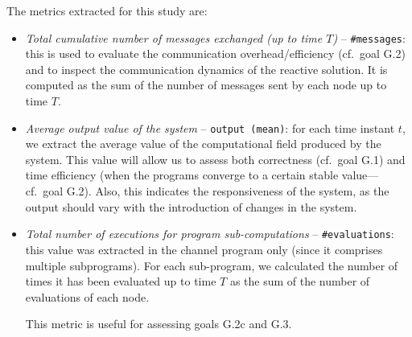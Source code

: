The metrics extracted for this study are:
\begin{itemize}
  \item \emph{Total cumulative number of messages exchanged (up to time $T$)}  -- \texttt{\#messages}: 
 this is used to evaluate the communication overhead/efficiency (cf.\ goal G.2)
 and to inspect the communication dynamics of the reactive solution.
  It is computed as the sum of the number of messages sent by each node up to time $T$.
    
  \item \emph{Average output value of the system} -- \texttt{output (mean)}: for each time instant $t$, we extract the average value of the computational field produced by the system.
  This value will allow us to assess both correctness (cf.\ goal G.1)
  and time efficiency (when the programs converge to a certain stable value---cf.\ goal G.2).
  Also, this indicates the responsiveness of the system, as the output should vary with the introduction of changes in the system.
  
  \item \emph{Total number of executions for program sub-computations} -- \texttt{\#evaluations}:
  this value was extracted in the channel program only (since it comprises multiple subprograms).
  For each sub-program, we calculated the number of times it has been evaluated up to time $T$ as the sum of the number of evaluations of each node.

  This metric is useful for assessing goals G.2c and G.3. %
  
\end{itemize}

